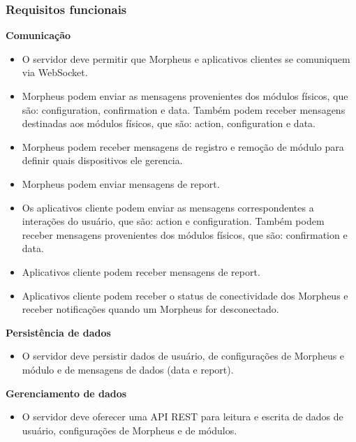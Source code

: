 \subsubsection{Requisitos funcionais}
\begin{description}

\item \textbf{Comunicação}

\begin{itemize}
\item O servidor deve permitir que Morpheus e aplicativos clientes se comuniquem via WebSocket.
\item Morpheus podem enviar as mensagens provenientes dos módulos físicos, que são: configuration, confirmation e data. Também podem receber mensagens destinadas aos módulos físicos, que são: action, configuration e data.
\item Morpheus podem receber mensagens de registro e remoção de módulo para definir quais dispositivos ele gerencia.
\item Morpheus podem enviar mensagens de report.
\item Os aplicativos cliente podem enviar as mensagens correspondentes a interações do usuário, que são: action e configuration. Também podem receber mensagens provenientes dos módulos físicos, que são: confirmation e data.
\item Aplicativos cliente podem receber mensagens de report.
\item Aplicativos cliente podem receber o status de conectividade dos Morpheus e receber notificações quando um Morpheus for desconectado.
\end{itemize}

\item \textbf{Persistência de dados}

\begin{itemize}
\item O servidor deve persistir dados de usuário, de configurações de Morpheus e módulo e de mensagens de dados (data e report).
\end{itemize}

\item \textbf{Gerenciamento de dados}

\begin{itemize}
\item O servidor deve oferecer uma API REST para leitura e escrita de dados de usuário, configurações de Morpheus e de módulos.
\end{itemize}

\end{description}

